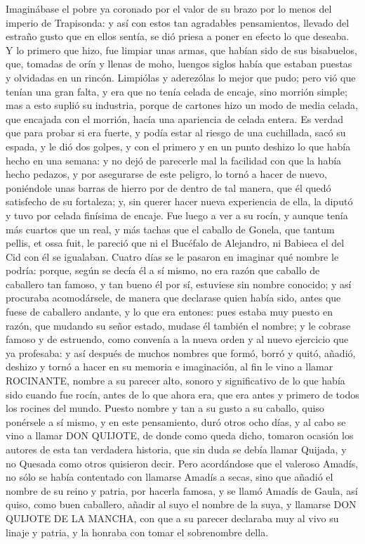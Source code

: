 \documentclass[12pt,
               twocolumn
              ]{article}
\begin{document}
Imaginábase el pobre ya coronado por el valor de su brazo por lo menos
del imperio de Trapisonda: y así con estos tan agradables
pensamientos, llevado del estraño gusto que en ellos sentía, se dió
priesa a poner en efecto lo que deseaba. Y lo primero que hizo, fue
limpiar unas armas, que habían sido de sus bisabuelos, que, tomadas de
orín y llenas de moho, luengos siglos había que estaban puestas y
olvidadas en un rincón. Limpiólas y aderezólas lo mejor que pudo; pero
vió que tenían una gran falta, y era que no tenía celada de encaje,
sino morrión simple; mas a esto suplió su industria, porque de
cartones hizo un modo de media celada, que encajada con el morrión,
hacía una apariencia de celada entera. Es verdad que para probar si
era fuerte, y podía estar al riesgo de una cuchillada, sacó su espada,
y le dió dos golpes, y con el primero y en un punto deshizo lo que
había hecho en una semana: y no dejó de parecerle mal la facilidad con
que la había hecho pedazos, y por asegurarse de este peligro, lo tornó
a hacer de nuevo, poniéndole unas barras de hierro por de dentro de
tal manera, que él quedó satisfecho de su fortaleza; y, sin querer
hacer nueva experiencia de ella, la diputó y tuvo por celada finísima
de encaje. Fue luego a ver a su rocín, y aunque tenía más cuartos que
un real, y más tachas que el caballo de Gonela, que tantum pellis, et
ossa fuit, le pareció que ni el Bucéfalo de Alejandro, ni Babieca el
del Cid con él se igualaban. Cuatro días se le pasaron en imaginar qué
nombre le podría: porque, según se decía él a sí mismo, no era razón
que caballo de caballero tan famoso, y tan bueno él por sí, estuviese
sin nombre conocido; y así procuraba acomodársele, de manera que
declarase quien había sido, antes que fuese de caballero andante, y lo
que era entones: pues estaba muy puesto en razón, que mudando su señor
estado, mudase él también el nombre; y le cobrase famoso y de
estruendo, como convenía a la nueva orden y al nuevo ejercicio que ya
profesaba: y así después de muchos nombres que formó, borró y quitó,
añadió, deshizo y tornó a hacer en su memoria e imaginación, al fin le
vino a llamar ROCINANTE, nombre a su parecer alto, sonoro y
significativo de lo que había sido cuando fue rocín, antes de lo que
ahora era, que era antes y primero de todos los rocines del
mundo. Puesto nombre y tan a su gusto a su caballo, quiso ponérsele a
sí mismo, y en este pensamiento, duró otros ocho días, y al cabo se
vino a llamar DON QUIJOTE, de donde como queda dicho, tomaron ocasión
los autores de esta tan verdadera historia, que sin duda se debía
llamar Quijada, y no Quesada como otros quisieron decir. Pero
acordándose que el valeroso Amadís, no sólo se había contentado con
llamarse Amadís a secas, sino que añadió el nombre de su reino y
patria, por hacerla famosa, y se llamó Amadís de Gaula, así quiso,
como buen caballero, añadir al suyo el nombre de la suya, y llamarse
DON QUIJOTE DE LA MANCHA, con que a su parecer declaraba muy al vivo
su linaje y patria, y la honraba con tomar el sobrenombre della.
\end{document}
